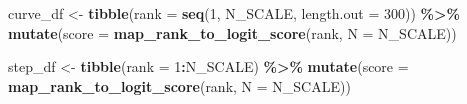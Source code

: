 \documentclass[
]{article}
\newenvironment{Shaded}{\begin{snugshade}}{\end{snugshade}}
\newcommand{\AttributeTok}[1]{\textcolor[rgb]{0.13,0.29,0.53}{#1}}
\newcommand{\DecValTok}[1]{\textcolor[rgb]{0.00,0.00,0.81}{#1}}
\newcommand{\FunctionTok}[1]{\textcolor[rgb]{0.13,0.29,0.53}{\textbf{#1}}}
\newcommand{\NormalTok}[1]{#1}
\newcommand{\OtherTok}[1]{\textcolor[rgb]{0.56,0.35,0.01}{#1}}
\newcommand{\SpecialCharTok}[1]{\textcolor[rgb]{0.81,0.36,0.00}{\textbf{#1}}}
\begin{document}
\begin{Shaded}
\begin{Highlighting}[]
\NormalTok{curve\_df }\OtherTok{\textless{}{-}} \FunctionTok{tibble}\NormalTok{(}\AttributeTok{rank =} \FunctionTok{seq}\NormalTok{(}\DecValTok{1}\NormalTok{, N\_SCALE, }\AttributeTok{length.out =} \DecValTok{300}\NormalTok{)) }\SpecialCharTok{\%\textgreater{}\%}
  \FunctionTok{mutate}\NormalTok{(}\AttributeTok{score =} \FunctionTok{map\_rank\_to\_logit\_score}\NormalTok{(rank, }\AttributeTok{N =}\NormalTok{ N\_SCALE))}

\NormalTok{step\_df }\OtherTok{\textless{}{-}} \FunctionTok{tibble}\NormalTok{(}\AttributeTok{rank =} \DecValTok{1}\SpecialCharTok{:}\NormalTok{N\_SCALE) }\SpecialCharTok{\%\textgreater{}\%}
  \FunctionTok{mutate}\NormalTok{(}\AttributeTok{score =} \FunctionTok{map\_rank\_to\_logit\_score}\NormalTok{(rank, }\AttributeTok{N =}\NormalTok{ N\_SCALE))}


\end{Highlighting}
\end{Shaded}
\end{document}
